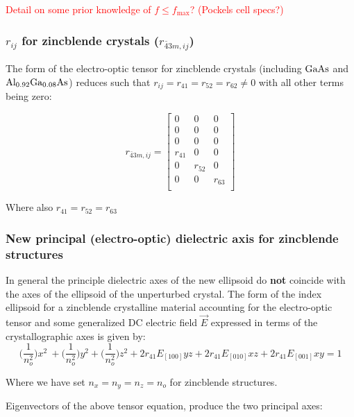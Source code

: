 \noindent \textcolor{red}{Detail on some prior knowledge of $f \leq f_\mathrm{max}$? (Pockels cell specs?)}


\subsubsection{$r_{ij}$ for zincblende crystals ($r_{\bar{4}3m, ij}$)}

The form of the electro-optic tensor for zincblende crystals (including $\mathrm{GaAs}$ and $\mathrm{Al_{0.92}Ga_{0.08}As}$) reduces such that $r_{ij} = r_{41} = r_{52} = r_{62} \neq 0$ with all other terms being zero:

\begin{equation}
r_{\bar{4}3m,ij} =
 \left[ {\begin{array}{ccc}
  0 & 0 & 0\\
  0 & 0 & 0\\
  0 & 0 & 0\\
  r_{41} & 0 & 0\\
  0 & r_{52} & 0\\
  0 & 0 & r_{63}\\
 \end{array}} \right]
\end{equation}

\noindent Where also $r_{41} = r_{52} = r_{63}$

\subsubsection{New principal (electro-optic) dielectric axis for zincblende structures}

In general the principle dielectric axes of the new ellipsoid do \textbf{not} coincide with the axes of the ellipsoid of the unperturbed crystal. The form of the index ellipsoid for a zincblende crystalline material accounting for the electro-optic tensor and some generalized DC electric field $\vec{E}$ expressed in terms of the crystallographic axes is given by:
\begin{equation}\label{eq:zindicatrix}
\bigg(\frac{1}{n_o^2} \bigg) x^2\ + \bigg(\frac{1}{n_o^2} \bigg) y^2 + \bigg(\frac{1}{n_o^2} \bigg) z^2  + 2r_{41} E_{[100]} yz + 2r_{41} E_{[010]} xz + 2r_{41}E_{[001]} xy= 1
\end{equation}

\noindent Where we have set $n_x = n_y = n_z = n_o$ for zincblende structures.

\noindent Eigenvectors of the above tensor equation, produce the two principal axes:	

